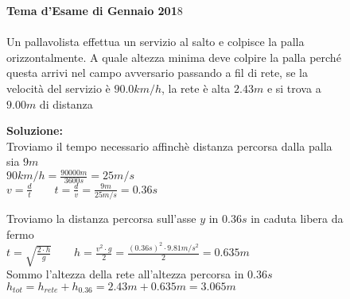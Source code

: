 \begin{figure}[h!]
\textbf{Tema d'Esame di Gennaio 201}8\\ \\
Un pallavolista effettua un servizio al salto e colpisce la palla orizzontalmente. A
quale altezza minima deve colpire la palla perché questa arrivi nel campo
avversario passando a fil di rete, se la velocità del servizio è $90.0 km/h$, la rete è
alta $2.43 m$ e si trova a $9.00 m$ di distanza\\ 
\begin{boxed}

\textbf{Soluzione:}\\
Troviamo il tempo necessario affinchè distanza percorsa dalla palla sia $9m$\\
$90km/h=\frac{90000m}{3600s}=25m/s$  \\
$v=\frac{d}{t} \qquad t=\frac{d}{v}=\frac{9m}{25m/s}=0.36s$

Troviamo la distanza percorsa sull'asse $y$ in $0.36s$ in caduta libera da fermo\\
$t=\sqrt{\frac{2\cdot h}{g}} \qquad h=\frac{v^2\cdot g}{2}= \frac{(0.36s)^2\cdot 9.81m/s^2}{2}=0.635m$\\

Sommo l'altezza della rete all'altezza percorsa in $0.36s$ \\
$h_{tot}=h_{rete} + h_{0.36} = 2.43m + 0.635m =3.065m$

\end{boxed}
\end{figure}

